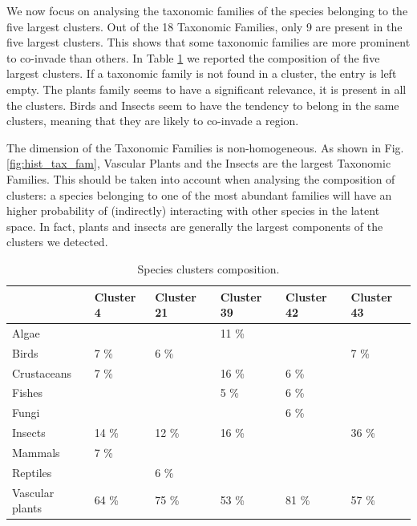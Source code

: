 \documentclass[mscthesis]{usiinfthesis}
\begin{document}
We now focus on analysing the taxonomic families of the species belonging to the five largest clusters. Out of the 18 Taxonomic Families, only 9 are present in the five largest clusters. This shows that some taxonomic families are more prominent to co-invade than others. In Table \ref{table:clusters_species} we reported the composition of the five largest clusters. If a taxonomic family is not found in a cluster, the entry is left empty. The plants family seems to have a significant relevance, it is present in all the clusters.  Birds and Insects seem to have the tendency to belong in the same clusters, meaning that they are likely to co-invade a region.

The dimension of the Taxonomic Families is non-homogeneous. As shown in Fig. \ref{fig:hist_tax_fam}, Vascular Plants and the Insects are the largest Taxonomic Families. This should be taken into account when analysing the composition of clusters: a species belonging to one of the most abundant families will have an higher probability of (indirectly) interacting with other species in the latent space. In fact, plants and insects are generally the largest components of the clusters we detected.

\begin{table}[H]
\centering
\begin{tabular}{|l|l|l|l|l|l|}
\hline
                & Cluster 4 & Cluster 21 & Cluster 39 & Cluster 42 & Cluster 43 \\ \hline
Algae           &           &            & 11 \%      &            &            \\ \hline
Birds           & 7 \%      & 6 \%       &            &            & 7 \%       \\ \hline
Crustaceans     & 7 \%      &            & 16 \%      & 6 \%       &            \\ \hline
Fishes          &           &            & 5 \%       & 6 \%       &            \\ \hline
Fungi           &           &            &            & 6 \%       &            \\ \hline
Insects         & 14 \%     & 12 \%      & 16 \%      &            & 36 \%      \\ \hline
Mammals         & 7 \%      &            &            &            &            \\ \hline
Reptiles        &           & 6 \%       &            &            &            \\ \hline
Vascular plants & 64 \%     & 75 \%      & 53 \%      & 81 \%      & 57 \%      \\ \hline
\end{tabular}
\caption{Species clusters composition.}
\label{table:clusters_species}
\end{table}
\end{document}
